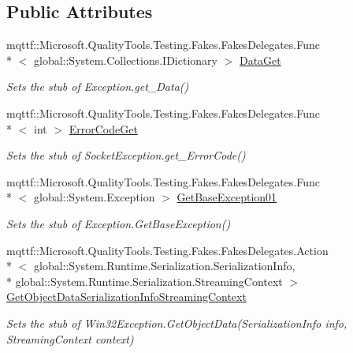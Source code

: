 \subsection*{Public Attributes}
\begin{DoxyCompactItemize}
\item 
mqttf\-::\-Microsoft.\-Quality\-Tools.\-Testing.\-Fakes.\-Fakes\-Delegates.\-Func\\*
$<$ global\-::\-System.\-Collections.\-I\-Dictionary $>$ \hyperlink{class_system_1_1_net_1_1_sockets_1_1_fakes_1_1_stub_socket_exception_a0fed105ab6046eee7f5edc7597419f3a}{Data\-Get}
\begin{DoxyCompactList}\small\item\em Sets the stub of Exception.\-get\-\_\-\-Data()\end{DoxyCompactList}\item 
mqttf\-::\-Microsoft.\-Quality\-Tools.\-Testing.\-Fakes.\-Fakes\-Delegates.\-Func\\*
$<$ int $>$ \hyperlink{class_system_1_1_net_1_1_sockets_1_1_fakes_1_1_stub_socket_exception_a86a4f00c75d2f00219fdc7b67844245b}{Error\-Code\-Get}
\begin{DoxyCompactList}\small\item\em Sets the stub of Socket\-Exception.\-get\-\_\-\-Error\-Code()\end{DoxyCompactList}\item 
mqttf\-::\-Microsoft.\-Quality\-Tools.\-Testing.\-Fakes.\-Fakes\-Delegates.\-Func\\*
$<$ global\-::\-System.\-Exception $>$ \hyperlink{class_system_1_1_net_1_1_sockets_1_1_fakes_1_1_stub_socket_exception_a7f18144ec07a48242a6e7bf50930b27c}{Get\-Base\-Exception01}
\begin{DoxyCompactList}\small\item\em Sets the stub of Exception.\-Get\-Base\-Exception()\end{DoxyCompactList}\item 
mqttf\-::\-Microsoft.\-Quality\-Tools.\-Testing.\-Fakes.\-Fakes\-Delegates.\-Action\\*
$<$ global\-::\-System.\-Runtime.\-Serialization.\-Serialization\-Info, \\*
global\-::\-System.\-Runtime.\-Serialization.\-Streaming\-Context $>$ \hyperlink{class_system_1_1_net_1_1_sockets_1_1_fakes_1_1_stub_socket_exception_a26fdb57d549b10d890cd542fe38a23de}{Get\-Object\-Data\-Serialization\-Info\-Streaming\-Context}
\begin{DoxyCompactList}\small\item\em Sets the stub of Win32\-Exception.\-Get\-Object\-Data(\-Serialization\-Info info, Streaming\-Context context)\end{DoxyCompactList}\item 

\end{DoxyCompactItemize}
